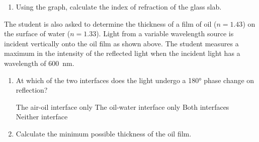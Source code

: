 \documentclass{../../../oss-apphys}
\begin{document}
\begin{enumerate}[leftmargin=15pt]
\begin{enumerate}
    \begin{center}
    \end{center}
  \item Using the graph, calculate the index of refraction of the glass slab.
  \end{enumerate}
  \newpage
  \begin{center}
  \end{center}
  The student is also asked to determine the thickness of a film of oil
  ($n=1.43$) on the surface of water ($n=1.33$). Light from a variable
  wavelength source is incident vertically onto the oil film as shown above.
  The student measures a maximum in the intensity of the reflected light when
  the incident light has a wavelength of \SI{600}{\nano\metre}.
  \begin{enumerate}[resume]
  \item At which of the two interfaces does the light undergo a \ang{180} phase
    change on reflection?

    \vspace{.1in}
    \underline{\hspace{.4in}} The air-oil interface only\hspace{.3in}
    \underline{\hspace{.4in}} The oil-water interface only\hspace{.3in}
    \underline{\hspace{.4in}} Both interfaces\hspace{.3in}\\
    \underline{\hspace{.4in}} Neither interface
    \vspace{.1in}
    
  \item Calculate the minimum possible thickness of the oil film.
  \end{enumerate}
\end{enumerate}
\end{document}
